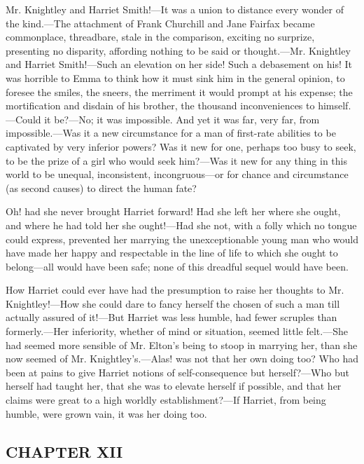 Mr. Knightley and Harriet Smith!---It was a union to distance every wonder of the kind.---The attachment of Frank Churchill and Jane Fairfax became commonplace, threadbare, stale in the comparison, exciting no surprize, presenting no disparity, affording nothing to be said or thought.---Mr. Knightley and Harriet Smith!---Such an elevation on her side! Such a debasement on his! It was horrible to Emma to think how it must sink him in the general opinion, to foresee the smiles, the sneers, the merriment it would prompt at his expense; the mortification and disdain of his brother, the thousand inconveniences to himself.---Could it be?---No; it was impossible. And yet it was far, very far, from impossible.---Was it a new circumstance for a man of first-rate abilities to be captivated by very inferior powers? Was it new for one, perhaps too busy to seek, to be the prize of a girl who would seek him?---Was it new for any thing in this world to be unequal, inconsistent, incongruous---or for chance and circumstance (as second causes) to direct the human fate?

Oh! had she never brought Harriet forward! Had she left her where she ought, and where he had told her she ought!---Had she not, with a folly which no tongue could express, prevented her marrying the unexceptionable young man who would have made her happy and respectable in the line of life to which she ought to belong---all would have been safe; none of this dreadful sequel would have been.

How Harriet could ever have had the presumption to raise her thoughts to Mr. Knightley!---How she could dare to fancy herself the chosen of such a man till actually assured of it!---But Harriet was less humble, had fewer scruples than formerly.---Her inferiority, whether of mind or situation, seemed little felt.---She had seemed more sensible of Mr. Elton's being to stoop in marrying her, than she now seemed of Mr. Knightley's.---Alas! was not that her own doing too? Who had been at pains to give Harriet notions of self-consequence but herself?---Who but herself had taught her, that she was to elevate herself if possible, and that her claims were great to a high worldly establishment?---If Harriet, from being humble, were grown vain, it was her doing too.

\subsection[chapter-xii-2]{\useURL[url50][][][]\from[url50]CHAPTER XII}

